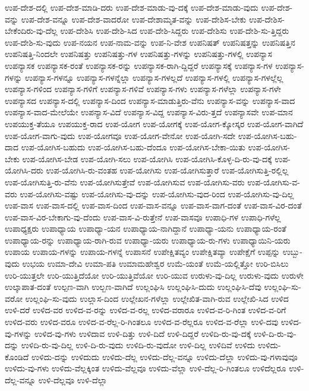 {ಉಪ-ದೇಶ-ದಲ್ಲಿ
ಉಪ-ದೇಶ-ಮಾಡಿ-ದರು
ಉಪ-ದೇಶ-ಮಾಡು-ವು-ದಕ್ಕೆ
ಉಪ-ದೇಶ-ಮಾಡು-ವುದು
ಉಪ-ದೇಶ-ವನ್ನು
ಉಪ-ದೇಶ-ವನ್ನೂ
ಉಪ-ದೇಶ-ವಾದರೋ
ಉಪ-ದೇಶಾಮೃತ-ವನ್ನು
ಉಪ-ದೇಶಿಸ-ಬೇಕು
ಉಪ-ದೇಶಿಸ-ಬೇಕೆಂದಿರು-ವು-ದೆಲ್ಲ
ಉಪ-ದೇಶಿಸಿ
ಉಪ-ದೇಶಿ-ಸಿದ
ಉಪ-ದೇಶಿ-ಸಿದ್ದರು
ಉಪ-ದೇಶಿಸು
ಉಪ-ದೇಶಿ-ಸು-ತ್ತಿದ್ದರು
ಉಪ-ದೇಶಿ-ಸು-ವುದು
ಉಪ-ನಯನ
ಉಪ-ನಾಮ-ವನ್ನು
ಉಪ-ನಿ-ವೇಶ
ಉಪನಿಷತ್
ಉಪನಿಷತ್ತನ್ನು
ಉಪನಿಷತ್ತಿನ
ಉಪನಿಷತ್ತಿ-ನಿಂದಲೇ
ಉಪನಿಷತ್ತು
ಉಪನಿಷತ್ತು-ಗಳ
ಉಪನಿಷತ್ತು-ಗಳನ್ನು
ಉಪನಿಷತ್ತು-ಗಳಲ್ಲಿ
ಉಪನ್ಯಾಸ
ಉಪನ್ಯಾಸಕ
ಉಪನ್ಯಾಸಕ-ರಂತೆ
ಉಪನ್ಯಾಸಕ-ರನ್ನು
ಉಪನ್ಯಾಸಕ-ರಾಗಿ-ದ್ದಿದ್ದರೆ
ಉಪನ್ಯಾಸಕ್ಕೆ
ಉಪನ್ಯಾಸ-ಗಳ
ಉಪನ್ಯಾಸ-ಗಳನ್ನು
ಉಪನ್ಯಾಸ-ಗಳನ್ನೂ
ಉಪನ್ಯಾಸ-ಗಳನ್ನೆಲ್ಲಾ
ಉಪನ್ಯಾಸ-ಗಳಲ್ಲದೆ
ಉಪನ್ಯಾಸ-ಗಳಲ್ಲಿ
ಉಪನ್ಯಾಸ-ಗಳಲ್ಲೆಲ್ಲ
ಉಪನ್ಯಾಸ-ಗಳಿಂದ
ಉಪನ್ಯಾಸ-ಗಳಿಗೆ
ಉಪನ್ಯಾಸ-ಗಳಿವೆ
ಉಪನ್ಯಾಸ-ಗಳು
ಉಪನ್ಯಾಸ-ಗಳೆಲ್ಲಾ
ಉಪನ್ಯಾಸ-ಗಳೇ
ಉಪನ್ಯಾಸದ
ಉಪನ್ಯಾಸ-ದಲ್ಲಿ
ಉಪನ್ಯಾಸ-ದಿಂದ
ಉಪನ್ಯಾಸ-ಮಾಡುತ್ತಿರು-ವೆನು
ಉಪನ್ಯಾಸ-ವನ್ನು
ಉಪನ್ಯಾಸ-ವಾದ
ಉಪನ್ಯಾಸ-ವಾದ-ಮೇಲೆಯೇ
ಉಪನ್ಯಾಸ-ವಿದೆ
ಉಪನ್ಯಾಸ-ವಿದ್ದ
ಉಪನ್ಯಾಸ-ವಿರು-ತ್ತದೆ
ಉಪನ್ಯಾಸವೇ
ಉಪ-ಮಾನ
ಉಪಯುಕ್ತ-ತೆಯೂ
ಉಪಯುಕ್ತ-ರಾದ
ಉಪ-ಯೋಗ
ಉಪ-ಯೋಗಕ್ಕೆ
ಉಪ-ಯೋಗ-ಕ್ಕೋಸ್ಕರ
ಉಪ-ಯೋಗ-ವಾಗಿದೆ
ಉಪ-ಯೋಗ-ವಾಗು-ವುದು
ಉಪ-ಯೋಗವೂ
ಉಪ-ಯೋಗ-ವೇನೋ
ಉಪ-ಯೋಗಿ-ಸದೇ
ಉಪ-ಯೋಗಿಸ-ಬಹು-ದಾದ
ಉಪ-ಯೋಗಿಸ-ಬಹುದು
ಉಪ-ಯೋಗಿಸ-ಬಹು-ದೆಂದೂ
ಉಪ-ಯೋಗಿಸ-ಬೇಕಾ-ಯಿತು
ಉಪ-ಯೋಗಿಸ-ಬೇಕು
ಉಪ-ಯೋಗಿಸ-ಬೇಡ
ಉಪ-ಯೋಗಿ-ಸಲು
ಉಪ-ಯೋಗಿಸಿ
ಉಪ-ಯೋಗಿಸಿ-ಕೊಳ್ಳ-ದಿ-ರು-ವು-ದಕ್ಕೆ
ಉಪ-ಯೋಗಿಸಿ-ದರು
ಉಪ-ಯೋಗಿಸಿ-ರು-ವಂತಹ
ಉಪ-ಯೋಗಿಸು
ಉಪ-ಯೋಗಿಸುತ್ತಾರೆ
ಉಪ-ಯೋಗಿಸುತ್ತಿ-ರಲ್ಲಿಲ್ಲ
ಉಪ-ಯೋಗಿಸುತ್ತಿ-ರು-ವೆನು
ಉಪ-ಯೋಗಿಸುತ್ತೇವೆ
ಉಪ-ಯೋಗಿಸುವ
ಉಪ-ಯೋಗಿಸು-ವರು
ಉಪ-ಯೋಗಿಸು-ವ-ವರು
ಉಪ-ಯೋಗಿಸು-ವಷ್ಟು
ಉಪ-ಯೋಗಿಸು-ವು-ದನ್ನು
ಉಪ-ಯೋಗಿಸು-ವುದ-ರಿಂದ
ಉಪ-ಯೋಗಿಸು-ವು-ದಿಲ್ಲ
ಉಪ-ವಾಸ
ಉಪ-ವಾಸ-ದಲ್ಲಿ
ಉಪ-ವಾಸ-ದಿಂದ
ಉಪ-ವಾಸ-ವನ್ನೂ
ಉಪ-ವಾಸ-ವಾಗ-ದಂತೆ
ಉಪ-ವಾಸ-ವಿರ-ದಂತೆ
ಉಪ-ವಾಸ-ವಿರ-ಬೇಕಾಗು-ವು-ದೆಂದು
ಉಪ-ವಾಸ-ವಿ-ರುತ್ತೇನೆ
ಉಪ-ವಾಸವೂ
ಉಪಾಧಿ-ಗಳ
ಉಪಾಧಿ-ಗಳೆಲ್ಲ
ಉಪಾಧ್ಯಕ್ಷರು
ಉಪಾಧ್ಯಾಯ
ಉಪಾಧ್ಯಾ-ಯನ
ಉಪಾಧ್ಯಾಯ-ನಾಗಿದ್ದಾನೆ
ಉಪಾಧ್ಯಾ-ಯನು
ಉಪಾಧ್ಯಾಯ-ರಂತೆ
ಉಪಾಧ್ಯಾಯ-ರನ್ನು
ಉಪಾಧ್ಯಾಯ-ರಾಗಿ-ರುವ
ಉಪಾಧ್ಯಾ-ಯರು
ಉಪಾಧ್ಯಾಯ-ರು-ಗಳು
ಉಪಾಧ್ಯಾಯಿನಿ-ಯರು
ಉಪಾಯ
ಉಪಾಯ-ಗಳನ್ನು
ಉಪಾಯ-ಗಳನ್ನೆ
ಉಪಾಸನೆ
ಉಪೇಕ್ಷಿತವ್ಯಂ
ಉಪೇಕ್ಷಿತವ್ಯಾ
ಉಪೇಕ್ಷೆಗೆ
ಉಪ್ಪನ್ನು
ಉಬ್ಬು-ವುದು
ಉಭಯ
ಉಮಾ-ದೇವಿ
ಉಮಾ-ಪತಿ
ಉಮಾಮಹೇಶ್ವರ
ಉಮೆ-ಯಂತೆ
ಉಮೆ-ಯಲ್ಲಿತ್ತೋ
ಉರಿ-ಬಿಸಿಲು
ಉರಿ-ಯುತ್ತಲೇ
ಉರಿ-ಯುತ್ತಿದೆಯೋ
ಉರಿ-ಯುತ್ತಿವೆಯೋ
ಉರಿ-ಯುವ
ಉರುಳು-ವು-ದಿಲ್ಲ
ಉರುಳು-ವುದು
ಉರುಳೇ
ಉಲ್ಕಾಪಾತ-ದಂತೆ
ಉಲ್ಪಣ-ವಾಗಿ
ಉಲ್ಬಣ-ವಾಗಿದೆ
ಉಲ್ಲಂಘಿಸಿ
ಉಲ್ಲಂಘಿಸಿ-ದುದು
ಉಲ್ಲಂಘಿಸಿ-ದೆವು
ಉಲ್ಲಂಘಿ-ಸು-ವರೋ
ಉಲ್ಲಂಘಿ-ಸು-ವುದು
ಉಲ್ಲಾಸ-ದಿಂದ
ಉಲ್ಲೇಖನ-ಗಳೆಲ್ಲಾ
ಉಲ್ಲೇಖಿತ-ವಾಗಿ-ರುವ
ಉಲ್ಲೇಖಿ-ಸಿದ
ಉಳಿದ
ಉಳಿ-ದರೆ
ಉಳಿದ-ವರ
ಉಳಿದ-ವ-ರನ್ನು
ಉಳಿದ-ವ-ರಲ್ಲ
ಉಳಿದ-ವರಾರೂ
ಉಳಿದ-ವ-ರಿ-ಗಿಂತ
ಉಳಿದ-ವ-ರಿಗೆ
ಉಳಿದ-ವರು
ಉಳಿದ-ವರೂ
ಉಳಿದ-ವ-ರೆಲ್ಲ-ರಿ-ಗಿಂತಲೂ
ಉಳಿದ-ವ-ರೆಲ್ಲರೂ
ಉಳಿದ-ವ-ರೆಲ್ಲಾ
ಉಳಿ-ದವು
ಉಳಿದ-ವು-ಗಳನ್ನು
ಉಳಿದ-ವು-ಗಳು
ಉಳಿದಾವ
ಉಳಿ-ದಿತ್ತು
ಉಳಿ-ದಿದೆ
ಉಳಿ-ದಿದ್ದರೆ
ಉಳಿದಿ-ರು-ವು-ದಕ್ಕೆ
ಉಳಿ-ದಿ-ರು-ವು-ದನ್ನು
ಉಳಿದಿ-ರು-ವು-ದಿಲ್ಲ
ಉಳಿ-ದಿ-ರು-ವುದು
ಉಳಿದಿ-ರು-ವುದೋ
ಉಳಿ-ದಿಲ್ಲ
ಉಳಿದಿವೆ
ಉಳಿದು
ಉಳಿದು-ಕೊಂಡಿದೆ
ಉಳಿದು-ದನ್ನು
ಉಳಿದುದು
ಉಳಿದು-ದೆಲ್ಲ
ಉಳಿದು-ದೆಲ್ಲ-ವನ್ನೂ
ಉಳಿದು-ದೆಲ್ಲಾ
ಉಳಿದು-ವು-ಗಳಾವುವೂ
ಉಳಿದು-ವು-ಗಳು
ಉಳಿದು-ವೆಲ್ಲಕ್ಕಿಂತ
ಉಳಿದು-ವೆಲ್ಲವೂ
ಉಳಿದು-ವೆಲ್ಲಾ
ಉಳಿ-ದೆಲ್ಲ-ರಿ-ಗಿಂತಲೂ
ಉಳಿದೆಲ್ಲರೂ
ಉಳಿ-ದೆಲ್ಲ-ವನ್ನೂ
ಉಳಿ-ದೆಲ್ಲವೂ
ಉಳಿ-ದೆಲ್ಲಾ
}

